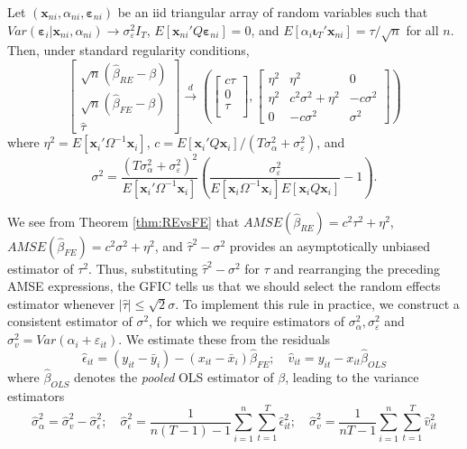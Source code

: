 \begin{thm}
\label{thm:REvsFE}
  Let $\left( \mathbf{x}_{ni}, \alpha_{ni}, \boldsymbol{\varepsilon}_{ni} \right)$ be an iid triangular array of random variables such that $Var(\boldsymbol{\varepsilon}_i|\mathbf{x}_{ni},\alpha_{ni})\rightarrow \sigma_{\varepsilon}^2 I_T$, $E[\mathbf{x}_{ni}'Q\boldsymbol{\varepsilon}_{ni}]=0$, and $E\left[ \alpha_i \boldsymbol{\iota}_T'\mathbf{x}_{ni} \right]=\tau/\sqrt{n}$ for all $n$.
  Then, under standard regularity conditions,
\[
  \left[\begin{array}{c}
\sqrt{n} (\widehat{\beta}_{RE} - \beta)\\
\sqrt{n} (\widehat{\beta}_{FE} - \beta)\\
\widehat{\tau}
\end{array}\right] \overset{d}{\rightarrow}  \left( 
\left[\begin{array}{c}
c\tau \\
0  \\
\tau\\
\end{array}\right],  
\left[\begin{array}{ccc}
\eta^2 & \eta^2 & 0 \\
\eta^2 & c^2\sigma^2 + \eta^2 & -c\sigma^2\\ 
0 & -c\sigma^2 & \sigma^2
\end{array}\right] \right)
\]
where $\eta^2 = E[\mathbf{x}_i'\Omega^{-1}\mathbf{x}_i]$, $c = E[\mathbf{x}_i' Q \mathbf{x}_i]/(T\sigma_\alpha^2 + \sigma_\varepsilon^2)$, and
\[\sigma^2 = \frac{(T\sigma_{\alpha}^2 + \sigma_{\varepsilon}^2)^2}{E\left[ \mathbf{x}_i'\Omega^{-1}\mathbf{x}_i \right]}\left( \frac{\sigma_{\varepsilon}^2}{E\left[ \mathbf{x}_i \Omega^{-1} \mathbf{x}_i \right]E\left[ \mathbf{x}_i Q \mathbf{x}_i \right]} - 1 \right). \]
\end{thm}



We see from Theorem \ref{thm:REvsFE} that $AMSE(\widehat{\beta}_{RE}) = c^2 \tau^2 + \eta^2$, $AMSE(\widehat{\beta}_{FE}) = c^2\sigma^2 + \eta^2$, and $\widehat{\tau}^2 - \sigma^2$ provides an asymptotically unbiased estimator of $\tau^2$.
Thus, substituting $\widehat{\tau}^2 - \sigma^2$ for $\tau$ and rearranging the preceding AMSE expressions, the GFIC tells us that we should select the random effects estimator whenever $|\widehat{\tau}|\leq \sqrt{2} \sigma$.
To implement this rule in practice, we construct a consistent estimator of $\sigma^2$, for which we require estimators of $\sigma_{\alpha}^2, \sigma_{\varepsilon}^2$ and $\sigma_{v}^2 = Var(\alpha_i + \varepsilon_{it})$.
We estimate these from the residuals
\[
\widehat{\epsilon}_{it} = (y_{it} -\bar{y}_i) - (x_{it} - \bar{x}_i) \widehat{\beta}_{FE}; \quad
\widehat{v}_{it} = y_{it} - x_{it} \widehat{\beta}_{OLS}
\]
where $\widehat{\beta}_{OLS}$ denotes the \emph{pooled} OLS estimator of $\beta$, leading to the variance estimators 
\[
\widehat{\sigma}_\alpha^2 = \widehat{\sigma}_v^2 - \widehat{\sigma}_\epsilon^2; \quad
\widehat{\sigma}_\epsilon^2 = \frac{1}{n(T-1)-1} \sum_{i=1}^n \sum_{t=1}^T \widehat{\epsilon}_{it}^2; \quad
\widehat{\sigma}_v^2 = \frac{1}{nT-1} \sum_{i=1}^n \sum_{t=1}^T \widehat{v}_{it}^2
\]

